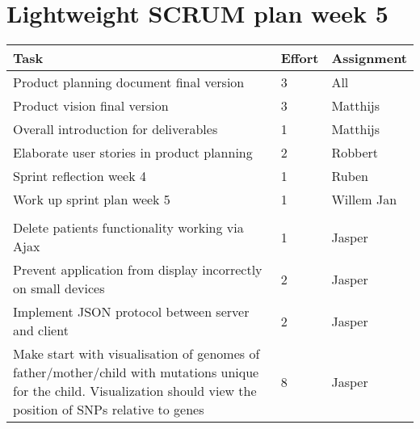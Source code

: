 \documentclass[a4paper]{report}
\begin{document}


\section*{Lightweight SCRUM plan week 5}

\setlength\extrarowheight{5pt}
\begin{table}[ht]
\begin{tabular}{p{8cm}|p{2cm}|p{3cm}}

\textbf{Task} & \textbf{Effort} & \textbf{Assignment}\\
\hline \hline

Product planning document final version & 3 & All\\
Product vision final version & 3 & Matthijs\\
Overall introduction for deliverables & 1 & Matthijs\\
Elaborate user stories in product planning & 2 & Robbert\\
Sprint reflection week 4 & 1 & Ruben\\
Work up sprint plan week 5 & 1 & Willem Jan\\

\vspace{10pt} & \vspace{10pt} & \vspace{10pt}\\

Delete patients functionality working via Ajax & 1 & Jasper\\
Prevent application from display incorrectly on small devices & 2 & Jasper\\
Implement JSON protocol between server and client & 2 & Jasper\\
Make start with visualisation of genomes of father/mother/child with mutations unique for the child. Visualization should view the position of SNPs relative to genes & 8 & Jasper\\
\end{tabular}
\end{table}
\end{document}

